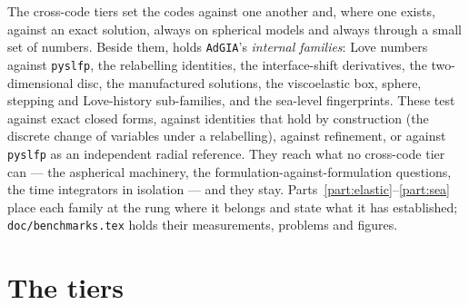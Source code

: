 \documentclass[11pt]{article}
\numberwithin{equation}{section}
\newcommand{\code}[1]{\texttt{#1}}
\begin{document}
The cross-code tiers set the codes against one another and, where one
exists, against an exact solution, always on spherical models and always
through a small set of numbers. Beside them,  holds
\code{AdGIA}'s \emph{internal families}: Love numbers against
\code{pyslfp}, the relabelling identities, the interface-shift derivatives,
the two-dimensional disc, the manufactured solutions, the viscoelastic box,
sphere, stepping and Love-history sub-families, and the sea-level
fingerprints. These test
against exact closed forms, against identities that hold by construction
(the discrete change of variables under a relabelling), against refinement,
or against \code{pyslfp} as an independent radial reference. They reach
what no cross-code tier can --- the aspherical machinery, the
formulation-against-formulation questions, the time integrators in
isolation --- and they stay. Parts~\ref{part:elastic}--\ref{part:sea} place
each family at the rung where it belongs and state what it has
established; \code{doc/benchmarks.tex} holds their
measurements, problems and figures.

\section{The tiers}
\label{sec:tiers}
\end{document}
